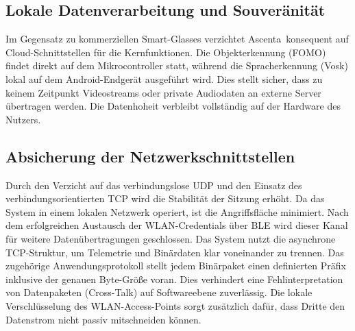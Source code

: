 \subsection{Lokale Datenverarbeitung und Souveränität}
Im Gegensatz zu kommerziellen Smart-Glasses verzichtet \glqq Ascenta\grqq\ konsequent auf Cloud-Schnittstellen für die Kernfunktionen. Die Objekterkennung (FOMO) findet direkt auf dem Mikrocontroller statt, während die Spracherkennung (Vosk) lokal auf dem Android-Endgerät ausgeführt wird. Dies stellt sicher, dass zu keinem Zeitpunkt Videostreams oder private Audiodaten an externe Server übertragen werden. Die Datenhoheit verbleibt vollständig auf der Hardware des Nutzers.

\subsection{Absicherung der Netzwerkschnittstellen}
Durch den Verzicht auf das verbindungslose UDP und den Einsatz des verbindungsorientierten TCP wird die Stabilität der Sitzung erhöht. Da das System in einem lokalen Netzwerk operiert, ist die Angriffsfläche minimiert. Nach dem erfolgreichen Austausch der WLAN-Credentials über BLE wird dieser Kanal für weitere Datenübertragungen geschlossen. Das System nutzt die asynchrone TCP-Struktur, um Telemetrie und Binärdaten klar voneinander zu trennen. Das zugehörige Anwendungsprotokoll stellt jedem Binärpaket einen definierten Präfix inklusive der genauen Byte-Größe voran. Dies verhindert eine Fehlinterpretation von Datenpaketen (Cross-Talk) auf Softwareebene zuverlässig. Die lokale Verschlüsselung des WLAN-Access-Points sorgt zusätzlich dafür, dass Dritte den Datenstrom nicht passiv mitschneiden können.